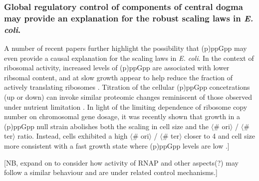 \subsubsection{Global regulatory control of components of central dogma may
provide an explanation for the robust scaling laws in \textit{E. coli}.}

A number of recent papers further highlight the possibility that (p)ppGpp may
even provide a causal explanation for the scaling laws in \textit{E. coli}. In
the context of ribosomal activity, increased levels of (p)ppGpp are associated
with lower ribsomal content, and at slow growth appear to help reduce the
fraction of actively translating ribosomes \citep{dai2016, dai2018}. Titration
of the cellular (p)ppGpp concetrations (up or down) can invoke similar proteomic
changes reminiscent of those observed under nutrient limitation \citep{zhu2019}.
In light of the limiting dependence of ribosome copy number on chromosomal gene
dosage, it was recently shown that growth in a (p)ppGpp  null strain abolishes
both the scaling in cell size  and the $\langle$\# ori$\rangle$ / $\langle$\#
ter$\rangle$ ratio. Instead, cells exhibited a high $\langle$\# ori$\rangle$ /
$\langle$\# ter$\rangle$ closer to 4 and cell size more consistent with a fast
growth state where (p)ppGpp levels are low \citep{fernandezcoll2020}.]

[NB, expand on to consider how activity of RNAP and other aspects(?) may follow a
similar behaviour and are under related control mechanisms.]
